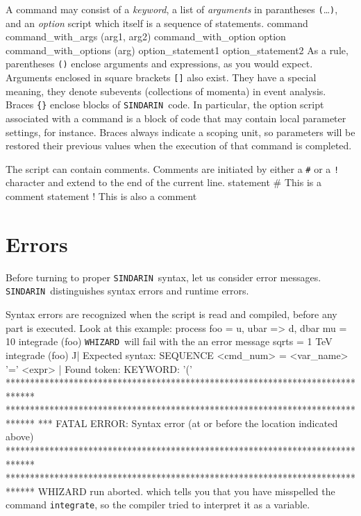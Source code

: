 \documentclass[12pt]{book}
\newenvironment{interaction}%
  {\begingroup\small
   \verbatim}%
  {\endverbatim
   \endgroup\noindent}
\newenvironment{code}%
  {\begingroup\footnotesize
   \quote
   \verbatim}%
  {\endverbatim
   \endquote
   \endgroup\noindent}
\newcommand{\ttt}[1]{\texttt{#1}}
\newcommand{\whizard}{\texttt{WHIZARD}}
\newcommand{\sindarin}{\texttt{SINDARIN}}
\begin{document}
A command may consist of a \emph{keyword}, a list of \emph{arguments} in
parantheses \ttt{(}\ldots\ttt{)}, and an \emph{option} script which
itself is a sequence of statements.
\begin{code}
command
command_with_args (arg1, arg2)
command_with_option { option }
command_with_options (arg) {
  option_statement1
  option_statement2
}
\end{code}
As a rule, parentheses \ttt{()} enclose arguments and expressions, as
you would expect.  Arguments enclosed in square brackets \ttt{[]} also
exist.  They have a special meaning, they denote subevents
(collections of momenta) in event analysis.  Braces \ttt{\{\}} enclose
blocks of \sindarin\ code.  In particular, the option script
associated with a command is a block of code that may contain local
parameter settings, for instance.  Braces always indicate a scoping
unit, so parameters will be restored their previous values when the
execution of that command is completed.

The script can contain comments.   Comments are initiated by either a \verb|#|
or a \verb|!| character and extend to the end of the current line.
\begin{code}
statement
# This is a comment
statement  ! This is also a comment
\end{code}


\section{Errors}

Before turning to proper \sindarin\ syntax, let us consider error messages.
\sindarin\ distinguishes syntax errors and runtime errors.

Syntax errors are recognized when the script is read and compiled,
before any part is executed.  Look at this example:
\begin{code}
process foo = u, ubar => d, dbar
mu = 10
integrade (foo)
\end{code} 
\whizard\ will fail with the an error message
\begin{interaction}
sqrts = 1 TeV
integrade (foo)
          ^^
| Expected syntax: SEQUENCE    <cmd_num> = <var_name> '=' <expr>
| Found token: KEYWORD:    '('
******************************************************************************
******************************************************************************
*** FATAL ERROR:  Syntax error (at or before the location indicated above)
******************************************************************************
******************************************************************************
WHIZARD run aborted.
\end{interaction}
which tells you that you have misspelled the command
\verb|integrate|, so the compiler tried to interpret it as a variable.
\end{document}
